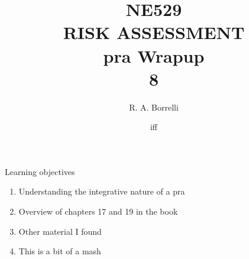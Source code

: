\documentclass[aspectratio=1610,pdftex,dvipsnames,compress,xcolor={dvipsnames}]{beamer}
\title[NE529 -- Risk Assessment]{NE529\\RISK ASSESSMENT\\\acs{pra} Wrapup\\8}
\author[@TheDoctorRAB]{R. A. Borrelli}
\institute[]{
    \acl{ui}\\
    \vspace{0.10in}
    }
\date{\acl{iff}}
\newcommand{\acs}{\acrshort} %
\begin{document}
\nobibliography* %


{
    \begin{frame}[plain]{}
        \titlepage
    \end{frame}
}


\begin{frame}{Learning objectives}
    \begin{enumerate}[series=outerlist,topsep=0pt,itemsep=21pt,leftmargin=*,label=(\arabic*)]
        \item[]Understanding the integrative nature of a \acs{pra}
        \item[]Overview of chapters 17 and 19 in the book
        \item[]Other material I found
        \item[]This is a bit of a mash
    \end{enumerate}
\end{frame}
\end{document}

